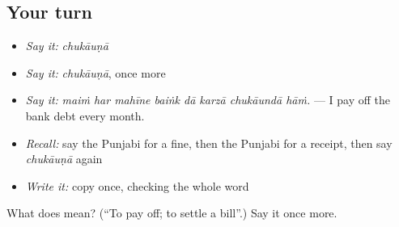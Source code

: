 \subsection*{Your turn}
\begin{itemize}
\raggedright
  \item \emph{Say it:} \emph{chukāuṇā}
  \item \emph{Say it:} \emph{chukāuṇā}, once more
  \item \emph{Say it:} \emph{maiṁ har mahīne baiṅk dā karzā chukāundā hāṁ.} — I pay off the bank debt every month.
  \item \emph{Recall:} say the Punjabi for a fine, then the Punjabi for a receipt, then say \emph{chukāuṇā} again
  \item \emph{Write it:} copy \textbf{} once, checking the whole word
\end{itemize}

\begin{tcolorbox}[breakable,colback=teal!4,colframe=teal!35!black,title={Before you move on}]
What does  mean? (\textquotedblleft{}To pay off; to settle a bill\textquotedblright{}.) Say it once more.
\end{tcolorbox}
